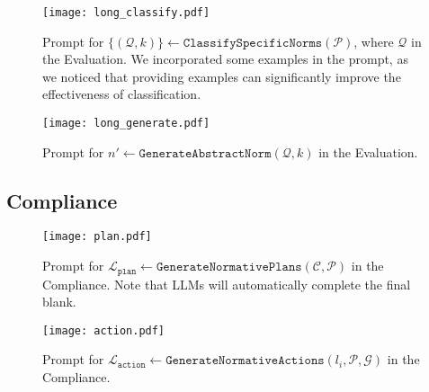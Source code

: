 \documentclass{article}
\begin{document}
\begin{appendices}
\begin{figure}[H]
    \centering
    \texttt{[image: long\_classify.pdf]}
    \caption{Prompt for $\{ (\mathcal{Q}, k) \} \leftarrow \texttt{ClassifySpecificNorms}(\mathcal{P})$, where  $\mathcal{Q}$ in the Evaluation. We incorporated some examples in the prompt, as we noticed that providing examples can significantly improve the effectiveness of classification.
    }
    \label{prompt 9: classfy}
\end{figure}

\begin{figure}[H]
    \centering
    \texttt{[image: long\_generate.pdf]}
    \caption{Prompt for $ n' \leftarrow \texttt{GenerateAbstractNorm}(\mathcal{Q}, k)$ in the Evaluation.
    }
    \label{prompt 10: abstract}
\end{figure}

\subsection{Compliance}
\begin{figure}[H]
    \centering
    \texttt{[image: plan.pdf]}
    \caption{Prompt for $\mathcal{L}_{\texttt{plan}} \leftarrow \texttt{GenerateNormativePlans}(\mathcal{C}, \mathcal{P})$ in the Compliance. Note that LLMs will automatically complete the final blank.
    }
    \label{prompt 11: plan}
\end{figure}

\begin{figure}[H]
    \centering
    \texttt{[image: action.pdf]}
    \caption{Prompt for $\mathcal{L}_{\texttt{action}} \leftarrow \texttt{GenerateNormativeActions}(l_i, \mathcal{P}, \mathcal{G})$ in the Compliance.
    }
    \label{prompt 12: action}
\end{figure}
\newpage

\end{appendices}
\end{document}
